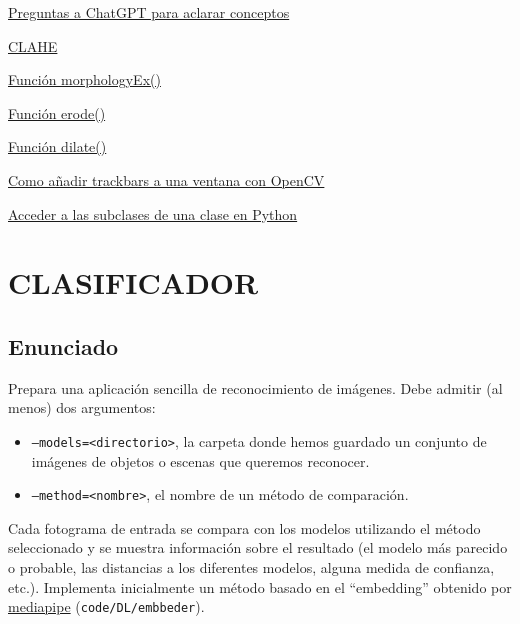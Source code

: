 \documentclass[12pt]{article}
\begin{document}
\href{https://chat.openai.com}{Preguntas a ChatGPT para aclarar conceptos}

\href{https://en.wikipedia.org/wiki/Adaptive_histogram_equalization}{CLAHE}

\href{https://docs.opencv.org/4.x/d4/d86/group__imgproc__filter.html#ga67493776e3ad1a3df63883829375201f}{Función morphologyEx()}

\href{https://docs.opencv.org/4.x/d4/d86/group__imgproc__filter.html#gaeb1e0c1033e3f6b891a25d0511362aeb}{Función erode()}

\href{https://docs.opencv.org/4.x/d4/d86/group__imgproc__filter.html#ga4ff0f3318642c4f469d0e11f242f3b6c}{Función dilate()}

\href{https://docs.opencv.org/3.4/da/d6a/tutorial_trackbar.html}{Como añadir trackbars a una ventana con OpenCV}

\href{https://stackoverflow.com/questions/3862310/how-to-find-all-the-subclasses-of-a-class-given-its-name}{Acceder a las subclases de una clase en Python}

\newpage
\section{CLASIFICADOR}
\subsection*{Enunciado}
Prepara una aplicación sencilla de reconocimiento de imágenes. Debe admitir (al menos) dos argumentos:

\begin{itemize}
    \item \texttt{--models=<directorio>}, la carpeta donde hemos guardado un conjunto de imágenes de objetos o escenas que queremos reconocer.

    \item \texttt{--method=<nombre>}, el nombre de un método de comparación.


\end{itemize}

Cada fotograma de entrada se compara con los modelos utilizando el método seleccionado y se muestra información sobre el resultado (el modelo más parecido o probable, las distancias a los diferentes modelos, alguna medida de confianza, etc.). Implementa inicialmente un método basado en el ``embedding'' obtenido por \href{https://developers.google.com/mediapipe/solutions/vision/image_embedder}{mediapipe} (\texttt{code/DL/embbeder}).
\end{document}
